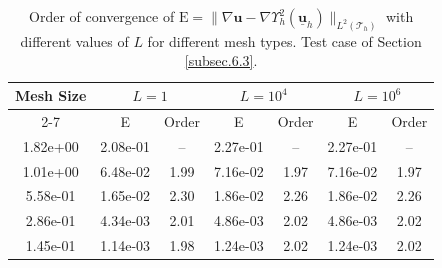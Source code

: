 \documentclass[a4paper,11pt]{article}
\theoremstyle{definition}
\theoremstyle{remark}
\newcommand{\uvec}[1]{\underline{\mathbf{#1}}}
\newcommand{\bo}[1]{\mathbf{#1}}
\newcommand{\up}[1]{\Upsilon^2_{#1}}
\def\cT{\mathcal{T}}
\begin{document}
\begin{table}[ht]
\begin{subtable}{\textwidth}
\centering
\scriptsize
\begin{tabular}{|c|c|c|c|c|c|c|}
\hline
\multirow{2}{*}{Mesh Size} & \multicolumn{2}{|c|}{$L=1$} & \multicolumn{2}{|c|}{$L=10^4$}& \multicolumn{2}{|c|}{$L=10^6$} \\ \cline{2-7}
                             & E & Order & E& Order& E& Order \\ \hline
1.82e+00 & 2.08e-01 & -- & 2.27e-01 & -- & 2.27e-01 & -- \\ \hline
1.01e+00 & 6.48e-02 & 1.99 & 7.16e-02 & 1.97 & 7.16e-02 & 1.97 \\ \hline
5.58e-01 & 1.65e-02 & 2.30 & 1.86e-02  & 2.26 & 1.86e-02 & 2.26 \\ \hline
2.86e-01 & 4.34e-03 & 2.01 & 4.86e-03 & 2.02 & 4.86e-03 & 2.02 \\ \hline
1.45e-01 & 1.14e-03 & 1.98 & 1.24e-03 & 2.02 & 1.24e-03 & 2.02 \\ \hline
\end{tabular}
\caption{Hexa-cut Mesh}
\end{subtable}
\caption{Order of convergence of $\text{E}=\lVert \nabla \bo{u}-\nabla\up{h}(\uvec{\bo{u}}_h) \rVert_{L^2(\cT_h)}$ with different values of $L$ for different mesh types. Test case of Section \ref{subsec.6.3}.}\label{table:6.1}
\end{table}

\end{document}
